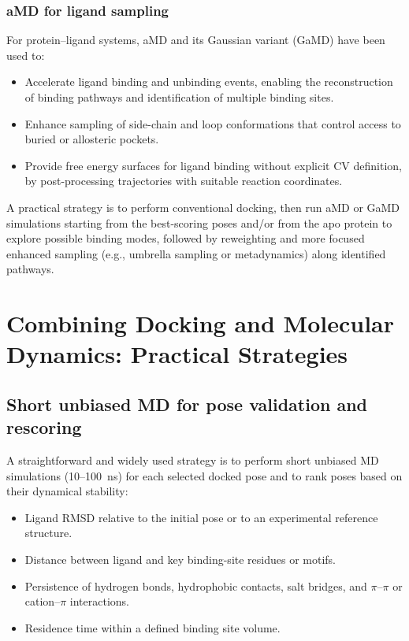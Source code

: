 \documentclass[12pt,a4paper]{article}
\begin{document}
\subsubsection{aMD for ligand sampling}

For protein--ligand systems, aMD and its Gaussian variant (GaMD) have been used to:

\begin{itemize}
\item Accelerate ligand binding and unbinding events, enabling the reconstruction of binding pathways and identification of multiple binding sites.
\item Enhance sampling of side-chain and loop conformations that control access to buried or allosteric pockets.
\item Provide free energy surfaces for ligand binding without explicit CV definition, by post-processing trajectories with suitable reaction coordinates.\cite{Miao2015,Markwick2011}
\end{itemize}

A practical strategy is to perform conventional docking, then run aMD or GaMD simulations starting from the best-scoring poses and/or from the apo protein to explore possible binding modes, followed by reweighting and more focused enhanced sampling (e.g., umbrella sampling or metadynamics) along identified pathways.

\section{Combining Docking and Molecular Dynamics: Practical Strategies}

\subsection{Short unbiased MD for pose validation and rescoring}

A straightforward and widely used strategy is to perform short unbiased MD simulations (10--100~ns) for each selected docked pose and to rank poses based on their dynamical stability:

\begin{itemize}
\item Ligand RMSD relative to the initial pose or to an experimental reference structure.
\item Distance between ligand and key binding-site residues or motifs.
\item Persistence of hydrogen bonds, hydrophobic contacts, salt bridges, and \(\pi\)–\(\pi\) or cation–\(\pi\) interactions.
\item Residence time within a defined binding site volume.
\end{itemize}
\end{document}
